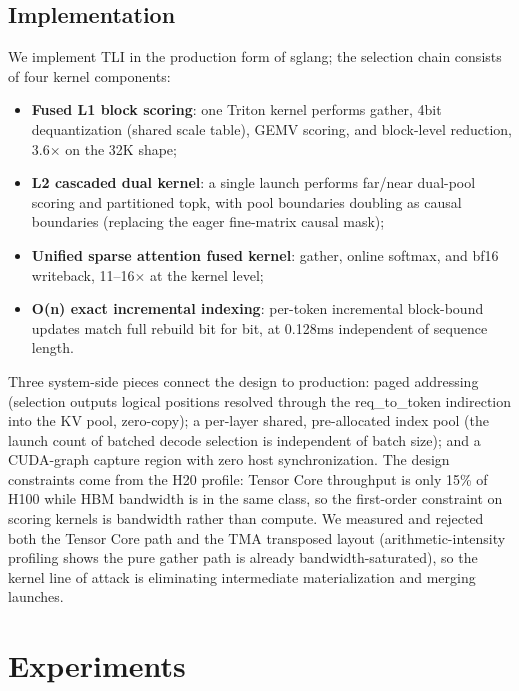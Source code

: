 \documentclass[11pt]{article}
\begin{document}
\subsection{Implementation}

We implement TLI in the production form of sglang; the selection chain consists of four kernel components:
\begin{itemize}
\item \textbf{Fused L1 block scoring}: one Triton kernel performs gather, 4bit dequantization (shared scale table), GEMV scoring, and block-level reduction, 3.6$\times$ on the 32K shape;
\item \textbf{L2 cascaded dual kernel}: a single launch performs far/near dual-pool scoring and partitioned topk, with pool boundaries doubling as causal boundaries (replacing the eager fine-matrix causal mask);
\item \textbf{Unified sparse attention fused kernel}: gather, online softmax, and bf16 writeback, 11--16$\times$ at the kernel level;
\item \textbf{O(n) exact incremental indexing}: per-token incremental block-bound updates match full rebuild bit for bit, at 0.128ms independent of sequence length.
\end{itemize}
Three system-side pieces connect the design to production: paged addressing (selection outputs logical positions resolved through the req\_to\_token indirection into the KV pool, zero-copy); a per-layer shared, pre-allocated index pool (the launch count of batched decode selection is independent of batch size); and a CUDA-graph capture region with zero host synchronization. The design constraints come from the H20 profile: Tensor Core throughput is only 15\% of H100 while HBM bandwidth is in the same class, so the first-order constraint on scoring kernels is bandwidth rather than compute. We measured and rejected both the Tensor Core path and the TMA transposed layout (arithmetic-intensity profiling shows the pure gather path is already bandwidth-saturated), so the kernel line of attack is eliminating intermediate materialization and merging launches.

\section{Experiments}
\end{document}
